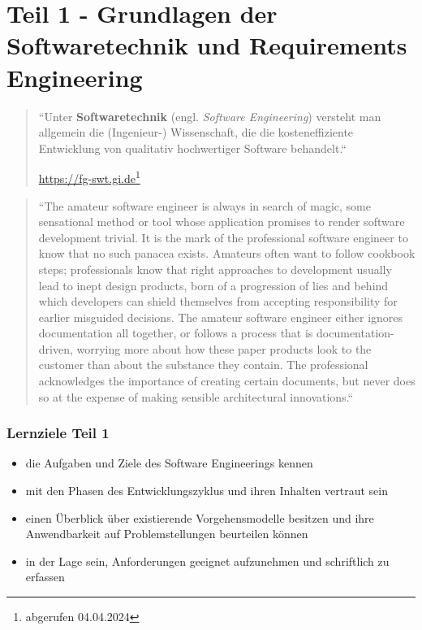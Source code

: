 \part{Teil 1 - Grundlagen der Softwaretechnik und Requirements Engineering}

\vspace{2cm}
\blockquote[{\url{https://fg-swt.gi.de}\footnote{abgerufen 04.04.2024}}]{``Unter \textbf{Softwaretechnik} (engl. \textit{Software Engineering}) versteht man allgemein die (Ingenieur-) Wissenschaft, die die kosteneffiziente Entwicklung von qualitativ hochwertiger Software behandelt.``}
\vspace{2cm}
\blockquote[{\cite[247]{BMEY07}}]{
    ``The amateur software engineer is always in search
    of magic, some sensational method or tool whose
    application promises to render software development trivial. It is the mark of the professional software engineer to know that no such panacea exists.
    Amateurs often want to follow cookbook steps; professionals know that right approaches to development usually lead to inept design products, born of a
    progression of lies and behind which developers can
    shield themselves from accepting responsibility for
    earlier misguided decisions. The amateur software
    engineer either ignores documentation all together,
    or follows a process that is documentation-driven,
    worrying more about how these paper products look
    to the customer than about the substance they contain. The professional acknowledges the importance
    of creating certain documents, but never does so at
    the expense of making sensible architectural innovations.``
}

\newpage
\section*{Lernziele Teil 1}

\begin{itemize}
    \item die Aufgaben und Ziele  des Software Engineerings kennen
    \item mit den Phasen des Entwicklungszyklus und ihren Inhalten vertraut sein
    \item einen Überblick über existierende Vorgehensmodelle besitzen und ihre Anwendbarkeit auf Problemstellungen beurteilen können
    \item in der Lage sein, Anforderungen geeignet aufzunehmen und schriftlich zu erfassen
\end{itemize}

\newpage